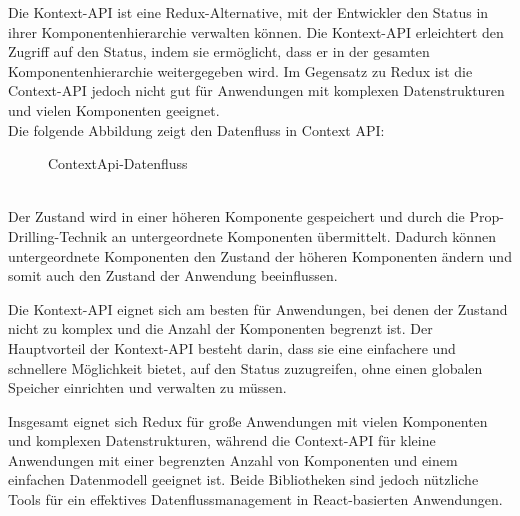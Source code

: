 Die Kontext-API ist eine Redux-Alternative, mit der Entwickler den Status in ihrer Komponentenhierarchie verwalten können. Die Kontext-API erleichtert den Zugriff auf den Status, indem sie ermöglicht, dass er in der gesamten Komponentenhierarchie weitergegeben wird. Im Gegensatz zu Redux ist die Context-API jedoch nicht gut für Anwendungen mit komplexen Datenstrukturen und vielen Komponenten geeignet.\cite{scalablepath} \\
Die folgende Abbildung zeigt den Datenfluss in Context API:
\begin{figure}[htbp]
	\centering
	\caption{ContextApi-Datenfluss}
\end{figure}\\
Der Zustand wird in einer höheren Komponente gespeichert und durch die Prop-Drilling-Technik an untergeordnete Komponenten übermittelt. Dadurch können untergeordnete Komponenten den Zustand der höheren Komponenten ändern und somit auch den Zustand der Anwendung beeinflussen.

Die Kontext-API eignet sich am besten für Anwendungen, bei denen der Zustand nicht zu komplex und die Anzahl der Komponenten begrenzt ist. Der Hauptvorteil der Kontext-API besteht darin, dass sie eine einfachere und schnellere Möglichkeit bietet, auf den Status zuzugreifen, ohne einen globalen Speicher einrichten und verwalten zu müssen. \cite{scalablepath}

Insgesamt eignet sich Redux für große Anwendungen mit vielen Komponenten und komplexen Datenstrukturen, während die Context-API für kleine Anwendungen mit einer begrenzten Anzahl von Komponenten und einem einfachen Datenmodell geeignet ist. Beide Bibliotheken sind jedoch nützliche Tools für ein effektives Datenflussmanagement in React-basierten Anwendungen. \cite{scalablepath}


